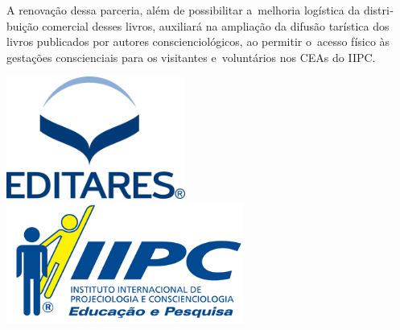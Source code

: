 \documentclass{gescons}
\begin{document}
A renovação dessa parceria, além de possibilitar a~melhoria logística da distri­buição comercial desses livros, auxiliará na ampliação da difusão tarística dos livros pu­blicados por autores conscienciológicos, ao permitir o~acesso físico às gestações conscien­ciais para os visitantes e~voluntários nos CEAs do IIPC.

\vspace{5mm}

\begin{center}
    \includegraphics[height=4cm]{images/Logo-Editares-com-Marca-Registrada}
    \hspace{3cm}
    \includegraphics[height=4cm]{images/IIPC_logo} 
\end{center}











\end{document}
